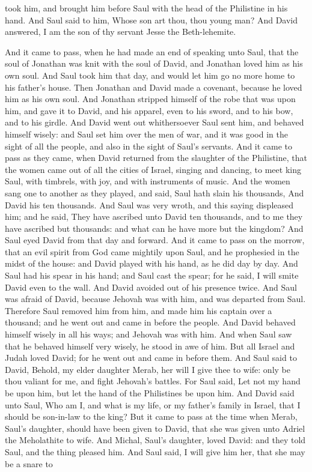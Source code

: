 took him, and brought him before Saul with the head of the Philistine in his hand. And Saul said to him, Whose son art thou, thou young man? And David answered, I am the son of thy servant Jesse the Beth-lehemite. 

And it came to pass, when he had made an end of speaking unto Saul, that the soul of Jonathan was knit with the soul of David, and Jonathan loved him as his own soul. And Saul took him that day, and would let him go no more home to his father’s house. Then Jonathan and David made a covenant, because he loved him as his own soul. And Jonathan stripped himself of the robe that was upon him, and gave it to David, and his apparel, even to his sword, and to his bow, and to his girdle. And David went out whithersoever Saul sent him, and behaved himself wisely: and Saul set him over the men of war, and it was good in the sight of all the people, and also in the sight of Saul’s servants.  And it came to pass as they came, when David returned from the slaughter of the Philistine, that the women came out of all the cities of Israel, singing and dancing, to meet king Saul, with timbrels, with joy, and with instruments of music. And the women sang one to another as they played, and said, Saul hath slain his thousands, And David his ten thousands.  And Saul was very wroth, and this saying displeased him; and he said, They have ascribed unto David ten thousands, and to me they have ascribed but thousands: and what can he have more but the kingdom? And Saul eyed David from that day and forward.  And it came to pass on the morrow, that an evil spirit from God came mightily upon Saul, and he prophesied in the midst of the house: and David played with his hand, as he did day by day. And Saul had his spear in his hand; and Saul cast the spear; for he said, I will smite David even to the wall. And David avoided out of his presence twice. And Saul was afraid of David, because Jehovah was with him, and was departed from Saul. Therefore Saul removed him from him, and made him his captain over a thousand; and he went out and came in before the people. And David behaved himself wisely in all his ways; and Jehovah was with him. And when Saul saw that he behaved himself very wisely, he stood in awe of him. But all Israel and Judah loved David; for he went out and came in before them.  And Saul said to David, Behold, my elder daughter Merab, her will I give thee to wife: only be thou valiant for me, and fight Jehovah’s battles. For Saul said, Let not my hand be upon him, but let the hand of the Philistines be upon him. And David said unto Saul, Who am I, and what is my life, or my father’s family in Israel, that I should be son-in-law to the king? But it came to pass at the time when Merab, Saul’s daughter, should have been given to David, that she was given unto Adriel the Meholathite to wife. And Michal, Saul’s daughter, loved David: and they told Saul, and the thing pleased him. And Saul said, I will give him her, that she may be a snare to 